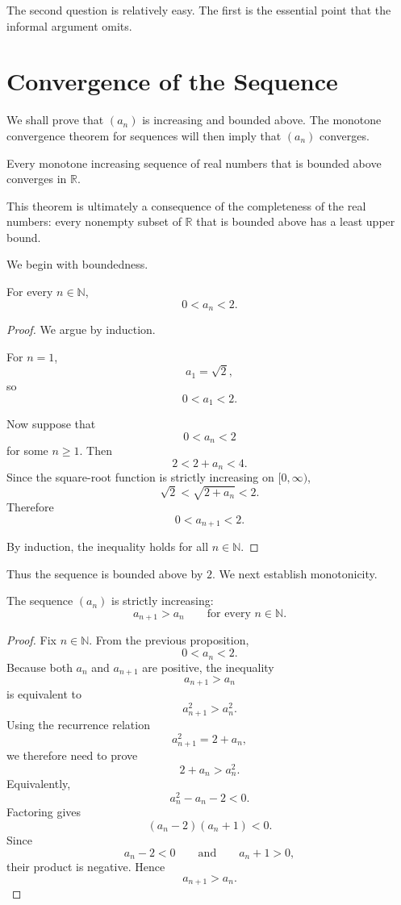 \documentclass{essay}
\begin{document}
The second question is relatively easy. The first is the essential point that the informal argument omits.

\section{Convergence of the Sequence}

We shall prove that \((a_n)\) is increasing and bounded above. The monotone convergence theorem for sequences will then imply that \((a_n)\) converges.

\begin{theorem}
Every monotone increasing sequence of real numbers that is bounded above converges in \(\mathbb{R}\).
\end{theorem}

This theorem is ultimately a consequence of the completeness of the real numbers: every nonempty subset of \(\mathbb{R}\) that is bounded above has a least upper bound.

We begin with boundedness.

\begin{proposition}
For every \(n\in\mathbb{N}\),
\[
0<a_n<2.
\]
\end{proposition}

\begin{proof}
We argue by induction.

For \(n=1\),
\[
a_1=\sqrt{2},
\]
so
\[
0<a_1<2.
\]

Now suppose that
\[
0<a_n<2
\]
for some \(n\geq 1\). Then
\[
2<2+a_n<4.
\]
Since the square-root function is strictly increasing on \([0,\infty)\),
\[
\sqrt{2}<\sqrt{2+a_n}<2.
\]
Therefore
\[
0<a_{n+1}<2.
\]

By induction, the inequality holds for all \(n\in\mathbb{N}\).
\end{proof}

Thus the sequence is bounded above by \(2\). We next establish monotonicity.

\begin{proposition}
The sequence \((a_n)\) is strictly increasing:
\[
a_{n+1}>a_n
\qquad
\text{for every } n\in\mathbb{N}.
\]
\end{proposition}

\begin{proof}
Fix \(n\in\mathbb{N}\). From the previous proposition,
\[
0<a_n<2.
\]
Because both \(a_n\) and \(a_{n+1}\) are positive, the inequality
\[
a_{n+1}>a_n
\]
is equivalent to
\[
a_{n+1}^2>a_n^2.
\]
Using the recurrence relation
\[
a_{n+1}^2=2+a_n,
\]
we therefore need to prove
\[
2+a_n>a_n^2.
\]
Equivalently,
\[
a_n^2-a_n-2<0.
\]
Factoring gives
\[
(a_n-2)(a_n+1)<0.
\]
Since
\[
a_n-2<0
\qquad\text{and}\qquad
a_n+1>0,
\]
their product is negative. Hence
\[
a_{n+1}>a_n.
\]
\end{proof}
\end{document}
